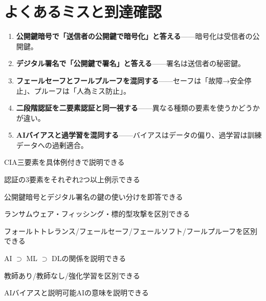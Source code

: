 \section{よくあるミスと到達確認}

\begin{yokumiss}[この章でよくあるミス]
\begin{enumerate}[leftmargin=1.6em, itemsep=5pt]
  \item \textbf{公開鍵暗号で「送信者の公開鍵で暗号化」と答える}——暗号化は受信者の公開鍵。
  \item \textbf{デジタル署名で「公開鍵で署名」と答える}——署名は送信者の秘密鍵。
  \item \textbf{フェールセーフとフールプルーフを混同する}——セーフは「故障→安全停止」、プルーフは「人為ミス防止」。
  \item \textbf{二段階認証を二要素認証と同一視する}——異なる種類の要素を使うかどうかが違い。
  \item \textbf{AIバイアスと過学習を混同する}——バイアスはデータの偏り、過学習は訓練データへの過剰適合。
\end{enumerate}
\end{yokumiss}

\begin{tatsaku}
  \item CIA三要素を具体例付きで説明できる
  \item 認証の3要素をそれぞれ2つ以上例示できる
  \item 公開鍵暗号とデジタル署名の鍵の使い分けを即答できる
  \item ランサムウェア・フィッシング・標的型攻撃を区別できる
  \item フォールトトレランス/フェールセーフ/フェールソフト/フールプルーフを区別できる
  \item AI $\supset$ ML $\supset$ DLの関係を説明できる
  \item 教師あり/教師なし/強化学習を区別できる
  \item AIバイアスと説明可能AIの意味を説明できる
\end{tatsaku}


